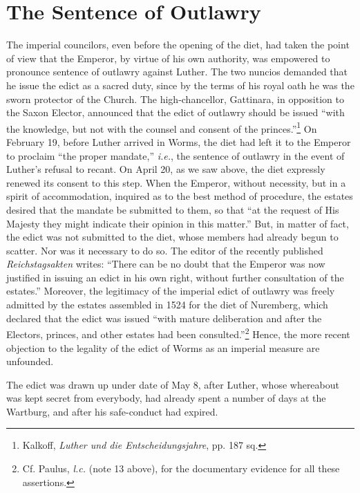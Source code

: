 
\section{The Sentence of Outlawry}

The imperial councilors, even before the opening of the diet, had
taken the point of view that the Emperor, by virtue of his own
authority, was empowered to pronounce sentence of outlawry
against Luther. The two nuncios demanded that he issue the
edict as a sacred duty, since by the terms of his royal oath he was
the sworn protector of the Church. The high-chancellor, Gattinara,
in opposition to the Saxon Elector, announced that the edict of
outlawry should be issued “with the knowledge, but not with the
counsel and consent of the princes.”\footnote{Kalkoff, \textit{Luther und die Entscheidungsjahre}, pp. 187 sq.}
On February 19, before
Luther arrived in Worms, the diet had left it to the Emperor to proclaim
“the proper mandate,” \textit{i.e.}, the sentence of outlawry in the event
of Luther’s refusal to recant. On April 20, as we saw above, the diet
expressly renewed its consent to this step. When the Emperor, without
necessity, but in a spirit of accommodation, inquired as to the
best method of procedure, the estates desired that the mandate be
submitted to them, so that “at the request of His Majesty they
might indicate their opinion in this matter.” But, in matter of fact,
the edict was not submitted to the diet, whose members had already
begun to scatter. Nor was it necessary to do so. The editor of the
recently published \textit{Reichstagsakten} writes: “There can be no doubt
that the Emperor was now justified in issuing an edict in his own
right, without further consultation of the estates.” Moreover, the
legitimacy of the imperial edict of outlawry was freely admitted by
the estates assembled in 1524 for the diet of Nuremberg, which
declared that the edict was issued “with mature deliberation and
after the Electors, princes, and other estates had been consulted.”\footnote
{Cf. Paulus, \textit{l.c.} (note 13 above), for the documentary evidence for all these assertions.}
Hence, the more recent objection to the legality of the edict of
Worms as an imperial measure are unfounded.

The edict was drawn up under date of May 8, after Luther, whose
whereabout was kept secret from everybody, had already spent a
number of days at the Wartburg, and after his safe-conduct had
expired.

